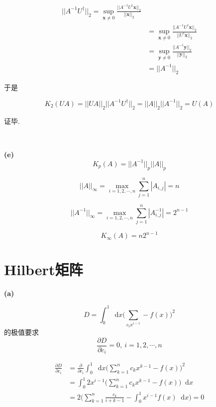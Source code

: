 \documentclass[UTF8]{ctexart}
\newcommand*{\dif}{\mathop{}\!\mathrm{d}}
\begin{document}
\begin{equation}\label{2-d-5}
\begin{aligned}
    ||A^{-1}U^\dagger||_2=\sup_{\mathbf{x}\neq 0}\frac{||A^{-1}U^\dagger\mathbf{x}||_2}{||\mathbf{x}||_2}\\
    &=\sup_{\mathbf{x}\neq 0}\frac{||A^{-1}U^\dagger\mathbf{x}||_2}{||U^\dagger\mathbf{x}||_2}\\
    &=\sup_{\mathbf{y}\neq 0}\frac{||A^{-1}\mathbf{y}||_2}{||\mathbf{y}||_2}\\
    &=||A^{-1}||_2
\end{aligned}
\end{equation}

于是

\begin{equation}\label{2-d-6}
    K_2(UA)=||UA||_2||A^{-1}U^\dagger||_2=||A||_2||A^{-1}||_2=U(A)
\end{equation}

证毕.

~\

\noindent\textbf{(e)}
$$K_p(A)=||A^{-1}||_p||A||_p$$

\begin{equation}\label{2-e-1}
||A||_\infty=\max_{i=1,2,\cdots,n}\sum_{j=1}^n|A_{i,j}|=n
\end{equation}

\begin{equation}\label{2-e-2}
||A^{-1}||_\infty=\max_{i=1,2,\cdots,n}\sum_{j=1}^n|A^{-1}_{i,j}|=2^{n-1}
\end{equation}

\begin{equation}\label{2-e-3}
K_\infty(A)=n2^{n-1}
\end{equation}

\section{Hilbert矩阵}

\noindent\textbf{(a)}

$$D=\int_0^1 \dif x\Big(\sum_{c_ix^{i-1}}-f(x)\Big)^2$$的极值要求
$$\frac{\partial D}{\partial c_i}=0,\ i=1,2,\cdots,n$$

\begin{equation}\label{3-a-1}
\begin{aligned}
\frac{\partial D}{\partial c_i}&=\frac{\partial}{\partial c_i}\int_0^1 \dif x\Big(\sum_{k=1}^nc_kx^{k-1}-f(x)\Big)^2\\
&=\int_0^1 2x^{i-1}\Big(\sum_{k=1}^nc_kx^{k-1}-f(x)\Big)\dif x\\
&=2\Big(\sum_{k=1}^n\frac{c_k}{i+k-1}-\int_0^1 x^{i-1}f(x)\dif x\Big)=0
\end{aligned}
\end{equation}
\end{document}
